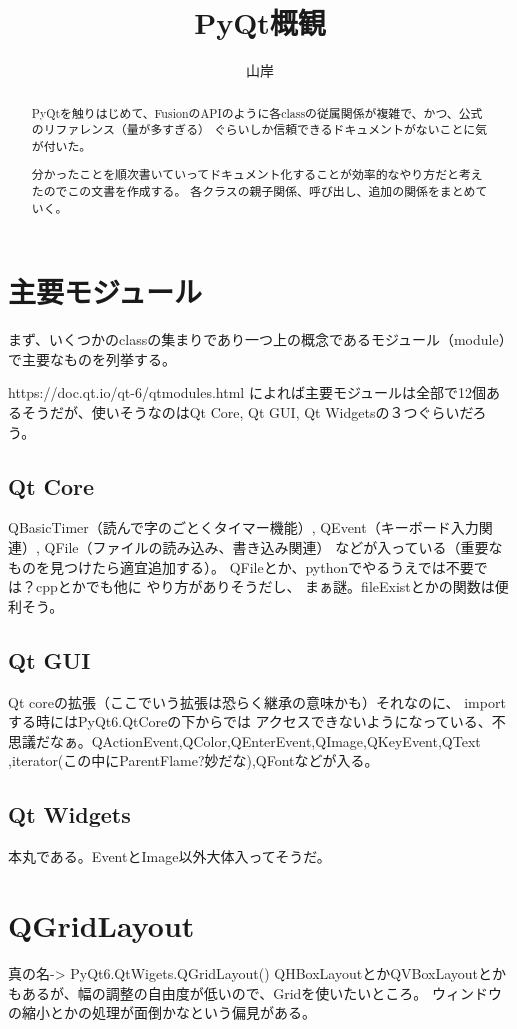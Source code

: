 \documentclass{ltjarticle}
\title{PyQt概観}
\author{山岸}
\begin{document}
\fussy
\maketitle
\begin{abstract}
  PyQtを触りはじめて、FusionのAPIのように各classの従属関係が複雑で、かつ、公式のリファレンス（量が多すぎる）
  ぐらいしか信頼できるドキュメントがないことに気が付いた。\par
  分かったことを順次書いていってドキュメント化することが効率的なやり方だと考えたのでこの文書を作成する。
  各クラスの親子関係、呼び出し、追加の関係をまとめていく。
\end{abstract}


\section{主要モジュール}
まず、いくつかのclassの集まりであり一つ上の概念であるモジュール（module）で主要なものを列挙する。\par
https://doc.qt.io/qt-6/qtmodules.html
によれば主要モジュールは全部で12個あるそうだが、使いそうなのはQt Core, Qt GUI, Qt Widgetsの３つぐらいだろう。
\subsection{Qt Core}
QBasicTimer（読んで字のごとくタイマー機能）, 
QEvent（キーボード入力関連）,
QFile（ファイルの読み込み、書き込み関連）
などが入っている（重要なものを見つけたら適宜追加する）。
QFileとか、pythonでやるうえでは不要では？cppとかでも他に
やり方がありそうだし、
まぁ謎。fileExistとかの関数は便利そう。
\subsection{Qt GUI}
Qt coreの拡張（ここでいう拡張は恐らく継承の意味かも）それなのに、
importする時にはPyQt6.QtCoreの下からでは
アクセスできないようになっている、不思議だなぁ。QActionEvent,QColor,QEnterEvent,QImage,QKeyEvent,QText
,iterator(この中にParentFlame?妙だな),QFontなどが入る。
\subsection{Qt Widgets}
本丸である。EventとImage以外大体入ってそうだ。

\section{QGridLayout}
真の名-> PyQt6.QtWigets.QGridLayout()
QHBoxLayoutとかQVBoxLayoutとかもあるが、幅の調整の自由度が低いので、Gridを使いたいところ。
ウィンドウの縮小とかの処理が面倒かなという偏見がある。
\end{document}
